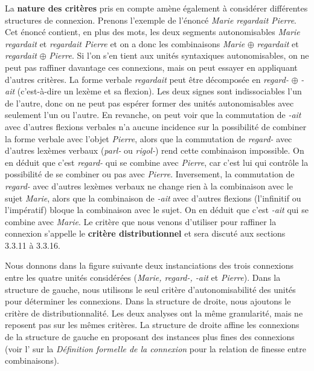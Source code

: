 La \textbf{nature des critères} pris en compte amène également à considérer différentes structures de connexion. Prenons l’exemple de l’énoncé \textit{Marie regardait Pierre}. Cet énoncé contient, en plus des mots, les deux segments autonomisables \textit{Marie regardait} et \textit{regardait Pierre} et on a donc les combinaisons \textit{Marie} ${\oplus}$ \textit{regardait} et \textit{regardait} ${\oplus}$ \textit{Pierre}. Si l’on s’en tient aux unités syntaxiques autonomisables, on ne peut pas raffiner davantage ces connexions, mais on peut essayer en appliquant d’autres critères. La forme verbale \textit{regardait} peut être décomposée en \textit{regard-} ${\oplus}$ \textit{{}-ait} (c’est-à-dire un lexème et sa flexion). Les deux signes sont indissociables l’un de l’autre, donc on ne peut pas espérer former des unités autonomisables avec seulement l’un ou l’autre. En revanche, on peut voir que la commutation de \textit{{}-ait} avec d’autres flexions verbales n’a aucune incidence sur la possibilité de combiner la forme verbale avec l’objet \textit{Pierre}, alors que la commutation de \textit{regard-} avec d’autres lexèmes verbaux (\textit{parl-} ou \textit{rigol-}) rend cette combinaison impossible. On en déduit que c’est \textit{regard-} qui se combine avec \textit{Pierre}, car c’est lui qui contrôle la possibilité de se combiner ou pas avec \textit{Pierre}. Inversement, la commutation de \textit{regard-} avec d’autres lexèmes verbaux ne change rien à la combinaison avec le sujet \textit{Marie}, alors que la combinaison de \textit{{}-ait} avec d’autres flexions (l’infinitif ou l’impératif) bloque la combinaison avec le sujet. On en déduit que c’est \textit{{}-ait} qui se combine avec \textit{Marie}. Le critère que nous venons d’utiliser pour raffiner la connexion s’appelle le \textbf{critère distributionnel} et sera discuté aux sections 3.3.11 à 3.3.16.

Nous donnons dans la figure suivante deux instanciations des trois connexions entre les quatre unités considérées (\textit{Marie, regard-, -ait} et \textit{Pierre}). Dans la structure de gauche, nous utilisons le seul critère d’autonomisabilité des unités pour déterminer les connexions. Dans la structure de droite, nous ajoutons le critère de distributionnalité. Les deux analyses ont la même granularité, mais ne reposent pas sur les mêmes critères. La structure de droite affine les connexions de la structure de gauche en proposant des instances plus fines des connexions (voir l’ sur la \textit{Définition formelle de la connexion} pour la relation de finesse entre combinaisons).

